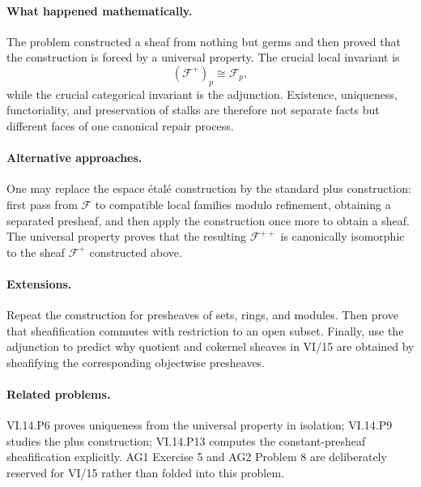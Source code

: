 \paragraph{What happened mathematically.}
The problem constructed a sheaf from nothing but germs and then proved that the construction
is forced by a universal property.  The crucial local invariant is
\[
(\mathcal F^+)_p\cong\mathcal F_p,
\]
while the crucial categorical invariant is the adjunction.  Existence, uniqueness,
functoriality, and preservation of stalks are therefore not separate facts but different
faces of one canonical repair process.

\paragraph{Alternative approaches.}
One may replace the espace \'{e}tal\'{e} construction by the standard plus construction:
first pass from $\mathcal F$ to compatible local families modulo refinement, obtaining a
separated presheaf, and then apply the construction once more to obtain a sheaf.  The
universal property proves that the resulting $\mathcal F^{++}$ is canonically isomorphic to
the sheaf $\mathcal F^+$ constructed above.

\paragraph{Extensions.}
Repeat the construction for presheaves of sets, rings, and modules.  Then prove that
sheafification commutes with restriction to an open subset.  Finally, use the adjunction to
predict why quotient and cokernel sheaves in VI/15 are obtained by sheafifying the
corresponding objectwise presheaves.

\paragraph{Related problems.}
VI.14.P6 proves uniqueness from the universal property in isolation; VI.14.P9 studies the
plus construction; VI.14.P13 computes the constant-presheaf sheafification explicitly.
AG1 Exercise 5 and AG2 Problem 8 are deliberately reserved for VI/15 rather than folded into
this problem.
\fi
